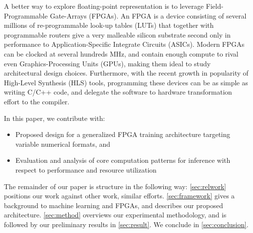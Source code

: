 \documentclass[techrep,english]{ipsj} %
\begin{document}
A better way to explore floating-point representation is to leverage Field-Programmable Gate-Arrays (FPGAs).
An FPGA is a device consisting of several millions of re-programmable look-up tables (LUTs) that together with programmable routers give a very malleable silicon substrate second only in performance to Application-Specific Integrate Circuits (ASICs).
Modern FPGAs can be clocked at several hundreds MHz, and contain enough compute to rival even Graphics-Processing Units (GPUs), making them ideal to study architectural design choices.
Furthermore, with the recent growth in popularity of High-Level Synthesis (HLS) tools, programming these devices can be as simple as writing C/C++ code, and delegate the software to hardware transformation effort to the compiler.

In this paper, we contribute with:
\begin{itemize}
\item Proposed design for a generalized FPGA training architecture targeting variable numerical formats, and
\item Evaluation and analysis of core computation patterns for inference with respect to performance and resource utilization
\end{itemize}

The remainder of our paper is structure in the following way: \cref{sec:relwork} positions our work against other work, similar efforts.
\cref{sec:framework} gives a background to machine learning and FPGAs, and describes our proposed architecture.
\cref{sec:method} overviews our experimental methodology, and is followed by our preliminary results in \cref{sec:result}.
We conclude in \cref{sec:conclusion}.
\end{document}
